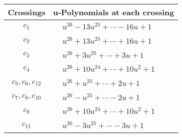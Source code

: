 \documentclass[1p]{elsarticle_modified}
\theoremstyle{definition}
\begin{document}
\begin{tabular}{m{50pt}|m{274pt}}
Crossings & \hspace{64pt}u-Polynomials at each crossing \\
\hline $$\begin{aligned}c_{1}\end{aligned}$$&$\begin{aligned}
&u^{26}-13 u^{25}+\cdots-16 u+1
\end{aligned}$\\
\hline $$\begin{aligned}c_{2}\end{aligned}$$&$\begin{aligned}
&u^{26}+13 u^{25}+\cdots+16 u+1
\end{aligned}$\\
\hline $$\begin{aligned}c_{3}\end{aligned}$$&$\begin{aligned}
&u^{26}+3 u^{25}+\cdots+3 u+1
\end{aligned}$\\
\hline $$\begin{aligned}c_{4}\end{aligned}$$&$\begin{aligned}
&u^{26}+10 u^{24}+\cdots+10 u^2+1
\end{aligned}$\\
\hline $$\begin{aligned}c_{5},c_{6},c_{12}\end{aligned}$$&$\begin{aligned}
&u^{26}+u^{25}+\cdots+2 u+1
\end{aligned}$\\
\hline $$\begin{aligned}c_{7},c_{8},c_{10}\end{aligned}$$&$\begin{aligned}
&u^{26}- u^{25}+\cdots-2 u+1
\end{aligned}$\\
\hline $$\begin{aligned}c_{9}\end{aligned}$$&$\begin{aligned}
&u^{26}+10 u^{24}+\cdots+10 u^2+1
\end{aligned}$\\
\hline $$\begin{aligned}c_{11}\end{aligned}$$&$\begin{aligned}
&u^{26}-3 u^{25}+\cdots-3 u+1
\end{aligned}$\\
\hline
\end{tabular}\\~\\
\end{document}
